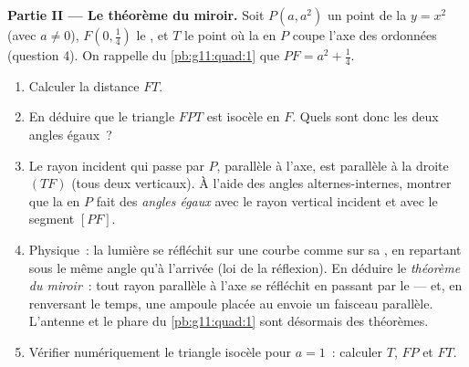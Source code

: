 \begin{problem}
\medskip
\noindent\textbf{Partie II --- Le théorème du miroir.}
Soit $P(a, a^2)$ un point de la  $y = x^2$ (avec
$a \neq 0$), $F\left(0, \frac14\right)$ le , et $T$ le point où
la  en $P$ coupe l'axe des ordonnées (question 4). On
rappelle du \cref{pb:g11:quad:1} que $PF = a^2 + \frac14$.
\begin{enumerate}[resume]
  \item Calculer la distance $FT$.
  \item En déduire que le triangle $FPT$ est isocèle en $F$. Quels
        sont donc les deux angles égaux~?
  \item Le rayon incident qui passe par $P$, parallèle à l'axe, est
        parallèle à la droite $(TF)$ (tous deux verticaux). À l'aide
        des angles alternes-internes, montrer que la  en $P$
        fait des \emph{angles égaux} avec le rayon vertical incident
        et avec le segment $[PF]$.
  \item Physique~: la lumière se réfléchit sur une courbe comme sur
        sa , en repartant sous le même angle qu'à l'arrivée
        (loi de la réflexion). En déduire le \emph{théorème du
        miroir}~: tout rayon parallèle à l'axe se réfléchit en
        passant par le  --- et, en renversant le temps, une
        ampoule placée au  envoie un faisceau parallèle.
        L'antenne et le phare du \cref{pb:g11:quad:1} sont
        désormais des théorèmes.
  \item Vérifier numériquement le triangle isocèle pour $a = 1$~:
        calculer $T$, $FP$ et $FT$.
\end{enumerate}


\end{problem}
